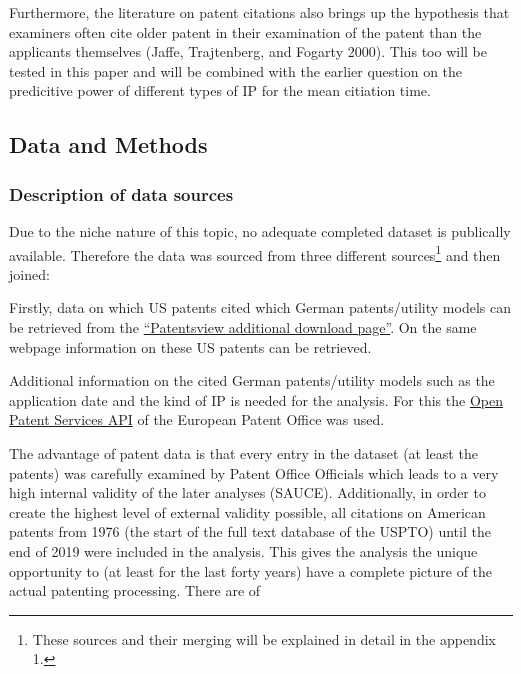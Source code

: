 \documentclass[
  12pt,
]{article}
\begin{document}
Furthermore, the literature on patent citations also brings up the
hypothesis that examiners often cite older patent in their examination
of the patent than the applicants themselves (Jaffe, Trajtenberg, and
Fogarty 2000). This too will be tested in this paper and will be
combined with the earlier question on the predicitive power of different
types of IP for the mean citiation time.

\hypertarget{data-and-methods}{%
\subsection{Data and Methods}\label{data-and-methods}}

\hypertarget{description-of-data-sources}{%
\subsubsection{Description of data
sources}\label{description-of-data-sources}}

Due to the niche nature of this topic, no adequate completed dataset is
publically available. Therefore the data was sourced from three
different sources\footnote{These sources and their merging will be
  explained in detail in the appendix 1.} and then joined:

Firstly, data on which US patents cited which German patents/utility
models can be retrieved from the
\href{https://www.patentsview.org/download/}{``Patentsview additional
download page''}. On the same webpage information on these US patents
can be retrieved.

Additional information on the cited German patents/utility models such
as the application date and the kind of IP is needed for the analysis.
For this the
\href{https://www.epo.org/searching-for-patents/data/web-services/ops.html\#tab-1}{Open
Patent Services API} of the European Patent Office was used.

The advantage of patent data is that every entry in the dataset (at
least the patents) was carefully examined by Patent Office Officials
which leads to a very high internal validity of the later analyses
(SAUCE). Additionally, in order to create the highest level of external
validity possible, all citations on American patents from 1976 (the
start of the full text database of the USPTO) until the end of 2019 were
included in the analysis. This gives the analysis the unique opportunity
to (at least for the last forty years) have a complete picture of the
actual patenting processing. There are of
\end{document}
